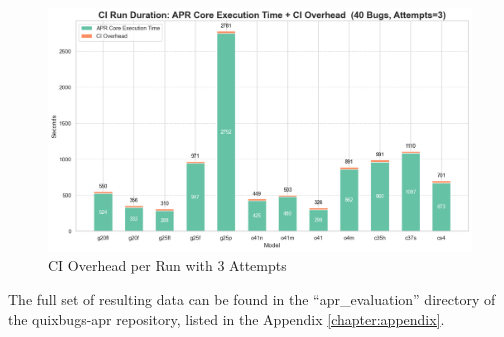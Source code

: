 \begin{figure}[H]
    \centering
    \includegraphics[width=1\textwidth]{images/diagrams/ci_vs_exec_time_per_run_stacked_attempts_3.png}
    \caption{CI Overhead per Run with 3 Attempts}
    \label{fig:ci-vs-exec-time-per-run-attempts-3}
\end{figure}


The full set of resulting data can be found in the ``apr\_evaluation'' directory of the quixbugs-apr repository, listed in the Appendix \ref{chapter:appendix}.